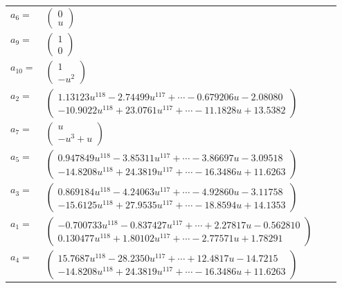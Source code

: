\documentclass[1p]{elsarticle_modified}
\theoremstyle{definition}
\begin{document}
\begin{tabular}{m{7pt} m{180pt} m{7pt} m{180pt} }
\flushright $a_{6}=$&$\begin{pmatrix}0\\u\end{pmatrix}$ \\
\flushright $a_{9}=$&$\begin{pmatrix}1\\0\end{pmatrix}$ \\
\flushright $a_{10}=$&$\begin{pmatrix}1\\- u^2\end{pmatrix}$ \\
\flushright $a_{2}=$&$\begin{pmatrix}1.13123 u^{118}-2.74499 u^{117}+\cdots-0.679206 u-2.08080\\-10.9022 u^{118}+23.0761 u^{117}+\cdots-11.1828 u+13.5382\end{pmatrix}$ \\
\flushright $a_{7}=$&$\begin{pmatrix}u\\- u^3+u\end{pmatrix}$ \\
\flushright $a_{5}=$&$\begin{pmatrix}0.947849 u^{118}-3.85311 u^{117}+\cdots-3.86697 u-3.09518\\-14.8208 u^{118}+24.3819 u^{117}+\cdots-16.3486 u+11.6263\end{pmatrix}$ \\
\flushright $a_{3}=$&$\begin{pmatrix}0.869184 u^{118}-4.24063 u^{117}+\cdots-4.92860 u-3.11758\\-15.6125 u^{118}+27.9535 u^{117}+\cdots-18.8594 u+14.1353\end{pmatrix}$ \\
\flushright $a_{1}=$&$\begin{pmatrix}-0.700733 u^{118}-0.837427 u^{117}+\cdots+2.27817 u-0.562810\\0.130477 u^{118}+1.80102 u^{117}+\cdots-2.77571 u+1.78291\end{pmatrix}$ \\
\flushright $a_{4}=$&$\begin{pmatrix}15.7687 u^{118}-28.2350 u^{117}+\cdots+12.4817 u-14.7215\\-14.8208 u^{118}+24.3819 u^{117}+\cdots-16.3486 u+11.6263\end{pmatrix}$ \\

\end{tabular}
\end{document}
